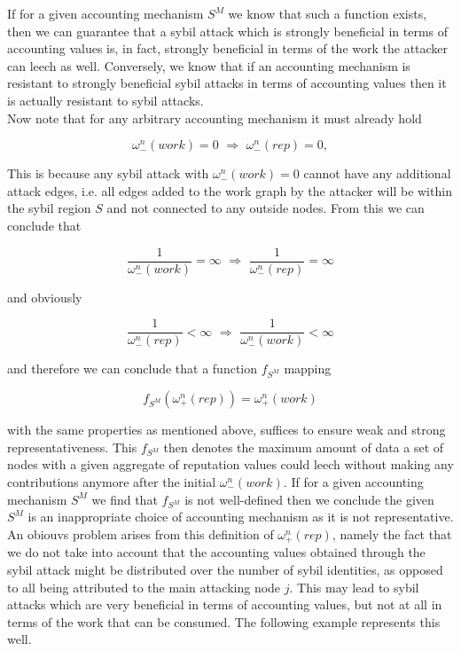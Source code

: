 \documentclass[11pt,a4paper]{report}
\theoremstyle{definition}
\theoremstyle{theorem}
\theoremstyle{proposition}
\theoremstyle{corollary}
\theoremstyle{lemma}
\theoremstyle{example}
\theoremstyle{remark}
\begin{document}
\noindent{}If for a given accounting mechanism $S^M$ we know that such a function exists, then we can guarantee that a sybil attack which is strongly beneficial in terms of accounting values is, in fact, strongly beneficial in terms of the work the attacker can leech as well. Conversely, we know that if an accounting mechanism is resistant to strongly beneficial sybil attacks in terms of accounting values then it is actually resistant to sybil attacks. \vspace{1em}\\

\noindent{}Now note that for any arbitrary accounting mechanism it must already hold

\[
\omega_{-}^{n}(work)=0 \,\,\Longrightarrow \,\, \omega_{-}^{n}(rep)=0,
\]

\noindent{}This is because any sybil attack with $\omega_{-}^{n}(work)=0$ cannot have any additional attack edges, i.e. all edges added to the work graph by the attacker will be within the sybil region $S$ and not connected to any outside nodes. From this we can conclude that 

\[
\frac{1}{\omega_{-}^{n}(work)} = \infty \,\, \Longrightarrow \,\, \frac{1}{\omega_{-}^{n}(rep)} = \infty
\]

\noindent{}and obviously

\[
\frac{1}{\omega_{-}^{n}(rep)} < \infty \,\, \Longrightarrow \,\, \frac{1}{\omega_{-}^{n}(work)} < \infty
\]

\noindent{}and therefore we can conclude that a function $f_{S^M}$ mapping 

\[
f_{S^M}(\omega^n_{+}(rep)) = \omega^n_{+}(work)
\]

\noindent{}with the same properties as mentioned above, suffices to ensure weak and strong representativeness. This $f_{S^M}$ then denotes the maximum amount of data a set of nodes with a given aggregate of reputation values could leech without making any contributions anymore after the initial $\omega_{-}^{n}(work)$. If for a given accounting mechanism $S^M$ we find that $f_{S^M}$ is not well-defined then we conclude the given $S^M$ is an inappropriate choice of accounting mechanism as it is not representative.\vspace{1em}\\

\noindent{}An obiouvs problem arises from this definition of $\omega_{+}^{n}(rep)$, namely the fact that we do not take into account that the accounting values obtained through the sybil attack might be distributed over the number of sybil identities, as opposed to all being attributed to the main attacking node $j$. This may lead to sybil attacks which are very beneficial in terms of accounting values, but not at all in terms of the work that can be consumed. The following example represents this well.
\end{document}
